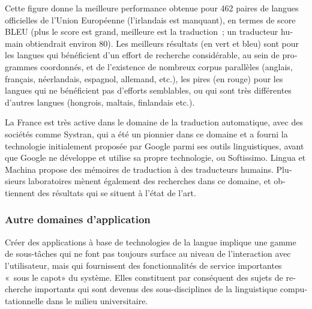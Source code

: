 \begin{french}
\begin{multicols}{2}
Cette figure donne la meilleure performance obtenue pour 462 paires de
langues officielles de l'Union Européenne (l'irlandais est manquant),
en termes de score BLEU (plus le score est grand, meilleure est la
traduction~; un traducteur humain obtiendrait environ 80). Les
meilleurs résultats (en vert et bleu) sont pour les langues qui
bénéficient d'un effort de recherche considérable, au sein de
programmes coordonnés, et de l'existence de nombreux corpus parallèles
(anglais, français, néerlandais, espagnol, allemand, etc.), les pires
(en rouge) pour les langues qui ne bénéficient pas d'efforts
semblables, ou qui sont très différentes d'autres langues (hongrois,
maltais, finlandais etc.).

La France est très active dans le domaine de la traduction
automatique, avec des sociétés comme Systran, qui a été un pionnier
dans ce domaine et a fourni la technologie initialement proposée par
Google parmi ses outils linguistiques, avant que Google ne développe
et utilise sa propre technologie, ou Softissimo. Lingua et Machina
propose des mémoires de traduction à des traducteurs
humains. Plusieurs laboratoires mènent également des recherches dans
ce domaine, et obtiennent des résultats qui se situent à l'état de
l'art.\\

\subsubsection{Autre domaines d'application}

Créer des applications à base de technologies de la langue implique
une gamme de sous-tâches qui ne font pas toujours surface au niveau de
l'interaction avec l'utilisateur, mais qui fournissent des
fonctionnalités de service importantes «~sous le capot» du
système. Elles constituent par conséquent des sujets de recherche
importants qui sont devenus des sous-disciplines de la linguistique
computationnelle dans le milieu universitaire.


\end{multicols}
\end{french}
